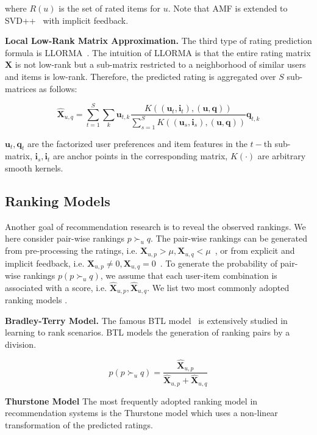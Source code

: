 \documentclass[letterpaper]{article} %
\newcommand{\Rating}{\mathbf{X}}
\begin{document}
where  $R(u)$ is the set of rated items for $u$. Note that AMF is extended to SVD++~\cite{Koren2008Factorization} with implicit feedback. 

\textbf{Local Low-Rank Matrix Approximation.} The third type of rating prediction formula is  LLORMA~\cite{Lee2013Local}. The intuition of LLORMA is that the entire rating matrix $\Rating$ is not low-rank but a sub-matrix restricted to a neighborhood of similar users and items is low-rank.  Therefore, the predicted rating is aggregated over $S$ sub-matrices  as follows:

\begin{equation}\label{equ:LLORMA}
\hat{\Rating}_{u,q} = \sum_{t=1}^{S} \sum_k \mathbf{u}_{t, k} \frac{K((\mathbf{u}_t,\mathbf{i}_t),(\mathbf{u},\mathbf{q}))}{\sum_{s=1}^{S} K((\mathbf{u}_s,\mathbf{i}_s),(\mathbf{u},\mathbf{q}))} \mathbf{q}_{t,k}
\end{equation}

$\mathbf{u}_t, \mathbf{q}_t$ are the factorized user preferences and item features in the $t-$th sub-matrix,  $\mathbf{i}_s,\mathbf{i}_t$ are anchor points in the corresponding matrix, $K(\cdot)$ are arbitrary smooth kernels. 


\subsection{Ranking Models}
Another goal of recommendation research is to reveal the observed rankings. We here consider pair-wise rankings $p\succ_u q$. The pair-wise rankings can be generated from pre-processing  the ratings, i.e. $\Rating_{u,p}> \mu, \Rating_{u,q}<\mu$~\cite{}, or from explicit and implicit feedback, i.e. $\Rating_{u,p}\neq 0, \Rating_{u,q}=0$~\cite{Rendle2009BPR}. To generate the probability of pair-wise rankings $p(p\succ_u q)$, we assume that each user-item combination is associated with a score, i.e. $\hat{\Rating}_{u,p},\hat{\Rating}_{u,q}$.  We list two most commonly adopted ranking models . 

\textbf{Bradley-Terry Model.} The famous BTL model~\cite{Hunter2004MM} is extensively studied in learning to rank scenarios. BTL models the generation of ranking pairs by a division.

\begin{equation}\label{equ:BTL}
p(p\succ_u q) = \frac{\hat{\Rating}_{u,p}}{\hat{\Rating}_{u,p}+ \hat{\Rating}_{u,q}} 
\end{equation}


\textbf{Thurstone Model} The most frequently adopted ranking model in recommendation systems is the Thurstone model which uses a non-linear transformation of the predicted ratings. 
\end{document}
